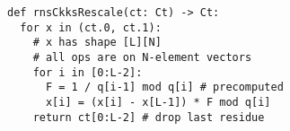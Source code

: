 \begin{figure}
\begin{lstlisting}[label=lst:rnsCkksRescale,caption={
  Implementation of rescale in RNS-CKKS from level $L$ to $L-1$.
}]
def rnsCkksRescale(ct: Ct) -> Ct:
  for x in (ct.0, ct.1):
    # x has shape [L][N]
    # all ops are on N-element vectors
    for i in [0:L-2]:
      F = 1 / q[i-1] mod q[i] # precomputed
      x[i] = (x[i] - x[L-1]) * F mod q[i]
    return ct[0:L-2] # drop last residue
\end{lstlisting}
\end{figure}
